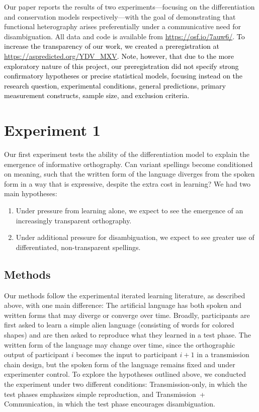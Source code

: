 \documentclass[doc,biblatex]{apa7}
\newcommand\newmaterial[1]{\textcolor{black}{#1}}
\begin{document}
Our paper reports the results of two experiments---focusing on the differentiation and conservation models respectively---with the goal of demonstrating that functional heterography arises preferentially under a communicative need for disambiguation. All data and code is available from \url{https://osf.io/7auw6/}. \newmaterial{To increase the transparency of our work, we created a preregistration at \url{https://aspredicted.org/YDV_MXV}. Note, however, that due to the more exploratory nature of this project, our preregistration did not specify strong confirmatory hypotheses or precise statistical models, focusing instead on the research question, experimental conditions, general predictions, primary measurement constructs, sample size, and exclusion criteria.}


\section{Experiment 1}

Our first experiment tests the ability of the differentiation model to explain the emergence of informative orthography. Can variant spellings become conditioned on meaning, such that the written form of the language diverges from the spoken form in a way that is expressive, despite the extra cost in learning? We had two main hypotheses:
\begin{enumerate}
	\item Under pressure from learning alone, we expect to see the emergence of an increasingly transparent orthography.
	\item Under additional pressure for disambiguation, we expect to see greater use of differentiated, non-transparent spellings.
\end{enumerate}

\subsection{Methods}

Our methods follow the experimental iterated learning literature, as described above, with one main difference: The artificial language has both spoken and written forms that may diverge or converge over time. Broadly, participants are first asked to learn a simple alien language (consisting of words for colored shapes) and are then asked to reproduce what they learned in a test phase. The written form of the language may change over time, since the orthographic output of participant $i$ becomes the input to participant $i+1$ in a transmission chain design, but the spoken form of the language remains fixed and under experimenter control. To explore the hypotheses outlined above, we conducted the experiment under two different conditions: Transmission-only, in which the test phases emphasizes simple reproduction, and Transmission~+ Communication, in which the test phase encourages disambiguation.
\end{document}
